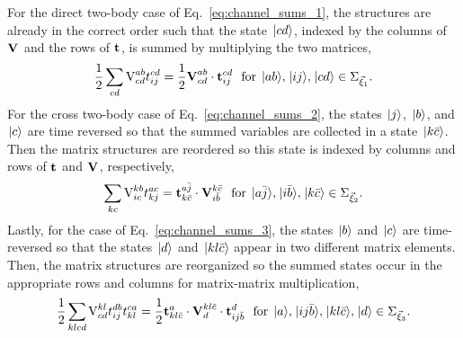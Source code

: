 \documentclass[thesis.tex]{subfiles}
\begin{document}
For the direct two-body case of Eq.\ \eqref{eq:channel_sums_1}, the structures are already in the correct order such that the state $\hspace{1pt}\lvert cd \rangle$, indexed by the columns of $\text{\textbf{V}}^{}_{}$ and the rows of $\mathbf{t}^{}_{}$, is summed by multiplying the two matrices,
\begin{equation} \label{eq:channel_matrices_1}
  \frac{1}{2}\sum\limits_{\mathclap{cd}}\vint{ab}{cd}\tamp{cd}{ij} = \frac{1}{2}\bvint{ab}{cd}\cdot\btamp{cd}{ij}\ \ \text{for}\ \ket{ab},\ket{ij},\ket{cd} \in \Sigma_{\vec{\xi}_{1}}.
\end{equation}
For the cross two-body case of Eq.\ \eqref{eq:channel_sums_2}, the states $\hspace{1pt}\lvert j \rangle$, $\hspace{1pt}\lvert b \rangle$, and $\hspace{1pt}\lvert c \rangle$ are time reversed so that the summed variables are collected in a state $\hspace{1pt}\lvert k\bar{c} \rangle$.  Then the matrix structures are reordered so this state is indexed by columns and rows of $\mathbf{t}^{}_{}$ and $\text{\textbf{V}}^{}_{}$, respectively,
\begin{equation} \label{eq:channel_matrices_2}
  \sum\limits_{\mathclap{kc}}\vint{kb}{ic}\tamp{ac}{kj} = \btamp{a\bar{j}}{k\bar{c}}\cdot\bvint{k\bar{c}}{i\bar{b}}\ \ \text{for}\ \ket{a\bar{j}},\ket{i\bar{b}},\ket{k\bar{c}} \in \Sigma_{\vec{\xi}_{2}}.
\end{equation}
Lastly, for the case of Eq.\ \eqref{eq:channel_sums_3}, the states $\hspace{1pt}\lvert b \rangle$ and $\hspace{1pt}\lvert c \rangle$ are time-reversed so that the states $\hspace{1pt}\lvert d \rangle$ and $\hspace{1pt}\lvert kl\bar{c} \rangle$ appear in two different matrix elements.  Then, the matrix structures are reorganized so the summed states occur in the appropriate rows and columns for matrix-matrix multiplication,
\begin{equation} \label{eq:channel_matrices_3}
  \frac{1}{2}\sum\limits_{\mathclap{klcd}}\vint{kl}{cd}\tamp{db}{ij}\tamp{ca}{kl} = \frac{1}{2}\btamp{a}{kl\bar{c}}\cdot\bvint{kl\bar{c}}{d}\cdot\btamp{d}{ij\bar{b}}\ \ \text{for}\ \ket{a},\ket{ij\bar{b}},\ket{kl\bar{c}},\ket{d} \in \Sigma_{\vec{\xi}_{3}}.
\end{equation}
\end{document}
